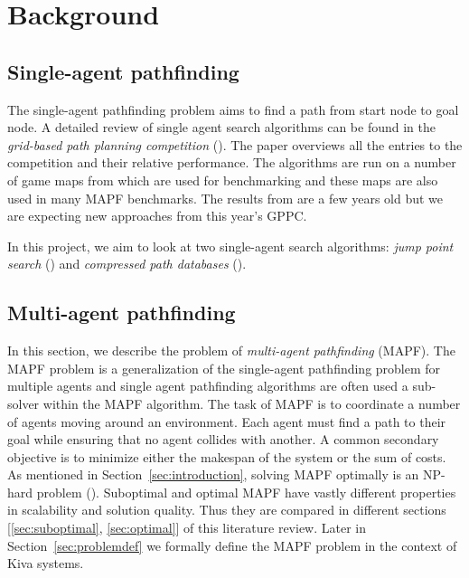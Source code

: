 \documentclass[a4paper,11pt]{article}
\begin{document}

\section{Background} \label{sec:background}
\subsection{Single-agent pathfinding} 
The single-agent pathfinding problem aims to find a path from start node to goal node. A detailed review of single agent search algorithms can be found in the \textit{grid-based path planning competition} (\cite{sturtevant2015grid}). The paper overviews all the entries to the competition and their relative performance. The algorithms are run on a number of game maps from \cite{sturtevant2012benchmarks} which are used for benchmarking and these maps are also used in many MAPF benchmarks. The results from \cite{sturtevant2015grid} are a few years old but we are expecting new approaches from this year's GPPC.

In this project, we aim to look at two single-agent search algorithms: \textit{jump point search} (\cite{harabor2011online}) and \textit{compressed path databases} (\cite{strasser2015compressing}).

\subsection{Multi-agent pathfinding} In this section, we describe the problem of \textit{multi-agent pathfinding} (MAPF). The MAPF problem is a generalization of the single-agent pathfinding problem for multiple agents and single agent pathfinding algorithms are often used a sub-solver within the MAPF algorithm. The task of MAPF is to coordinate a number of agents moving around an environment. Each agent must find a path to their goal while ensuring that no agent collides with another. A common secondary objective is to minimize either the makespan of the system or the sum of costs. As mentioned in Section~\ref{sec:introduction}, solving MAPF optimally is an NP-hard problem (\cite{yu2013structure}). Suboptimal and optimal MAPF have vastly different properties in scalability and solution quality. Thus they are compared in different sections [\ref{sec:suboptimal}, \ref{sec:optimal}] of this literature review. Later in Section~\ref{sec:problemdef} we formally define the MAPF problem in the context of Kiva systems.
\end{document}
